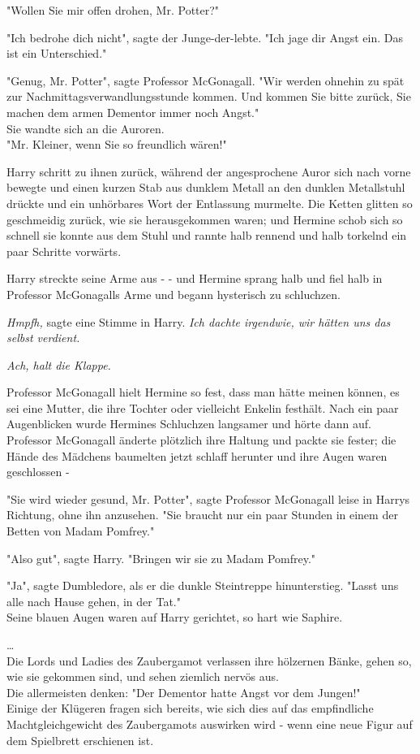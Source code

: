 {"Wollen Sie mir offen drohen, Mr. Potter?"

"Ich bedrohe dich nicht", sagte der Junge-der-lebte. "Ich jage dir Angst ein. Das ist ein Unterschied."

"Genug, Mr. Potter", sagte Professor McGonagall. "Wir werden ohnehin zu spät zur Nachmittagsverwandlungsstunde kommen. Und kommen Sie bitte zurück, Sie machen dem armen Dementor immer noch Angst."\\ Sie wandte sich an die Auroren.\\ "Mr. Kleiner, wenn Sie so freundlich wären!"

Harry schritt zu ihnen zurück, während der angesprochene Auror sich nach vorne bewegte und einen kurzen Stab aus dunklem Metall an den dunklen Metallstuhl drückte und ein unhörbares Wort der Entlassung murmelte. Die Ketten glitten so geschmeidig zurück, wie sie herausgekommen waren; und Hermine schob sich so schnell sie konnte aus dem Stuhl und rannte halb rennend und halb torkelnd ein paar Schritte vorwärts.

Harry streckte seine Arme aus - - und Hermine sprang halb und fiel halb in Professor McGonagalls Arme und begann hysterisch zu schluchzen.

\emph{Hmpfh,} sagte eine Stimme in Harry. \emph{Ich dachte irgendwie, wir hätten uns das selbst verdient.}

\emph{Ach, halt die Klappe.}

Professor McGonagall hielt Hermine so fest, dass man hätte meinen können, es sei eine Mutter, die ihre Tochter oder vielleicht Enkelin festhält. Nach ein paar Augenblicken wurde Hermines Schluchzen langsamer und hörte dann auf. Professor McGonagall änderte plötzlich ihre Haltung und packte sie fester; die Hände des Mädchens baumelten jetzt schlaff herunter und ihre Augen waren geschlossen -

"Sie wird wieder gesund, Mr. Potter", sagte Professor McGonagall leise in Harrys Richtung, ohne ihn anzusehen. "Sie braucht nur ein paar Stunden in einem der Betten von Madam Pomfrey."

"Also gut", sagte Harry. "Bringen wir sie zu Madam Pomfrey."

"Ja", sagte Dumbledore, als er die dunkle Steintreppe hinunterstieg. "Lasst uns alle nach Hause gehen, in der Tat."\\ Seine blauen Augen waren auf Harry gerichtet, so hart wie Saphire.

…\\ Die Lords und Ladies des Zaubergamot verlassen ihre hölzernen Bänke, gehen so, wie sie gekommen sind, und sehen ziemlich nervös aus.\\ Die allermeisten denken: "Der Dementor hatte Angst vor dem Jungen!"\\ Einige der Klügeren fragen sich bereits, wie sich dies auf das empfindliche Machtgleichgewicht des Zaubergamots auswirken wird - wenn eine neue Figur auf dem Spielbrett erschienen ist.

}
